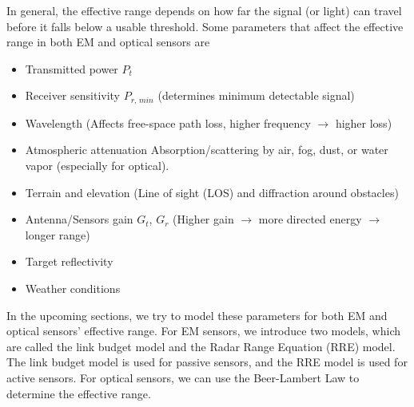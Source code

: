 \documentclass{article}
\begin{document}
In general, the effective range depends on how far the signal (or light) can travel before it falls below a usable threshold. Some parameters that affect the effective range in both EM and optical sensors are
\begin{itemize}
    \item Transmitted power $P_t$
    \item Receiver sensitivity $P_{r, \, min}$ (determines minimum detectable signal)
    \item Wavelength (Affects free-space path loss, higher frequency $\rightarrow$ higher loss)
    \item Atmospheric attenuation Absorption/scattering by air, fog, dust, or water vapor (especially for optical).
    \item Terrain and elevation (Line of sight (LOS) and diffraction around obstacles)
    \item Antenna/Sensors gain $G_t$, $G_r$ (Higher gain $\rightarrow$ more directed energy $\rightarrow$ longer range)
    \item Target reflectivity
    \item Weather conditions
\end{itemize}

In the upcoming sections, we try to model these parameters for both EM and optical sensors' effective range. For EM sensors, we introduce two models, which are called the link budget model and the Radar Range Equation (RRE) model. The link budget model is used for passive sensors, and the RRE model is used for active sensors. For optical sensors, we can use the Beer-Lambert Law to determine the effective range.
\end{document}
